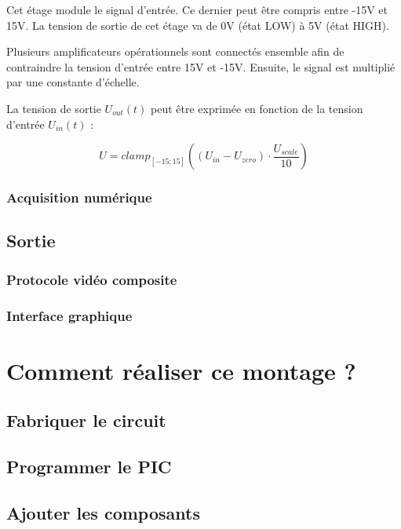\documentclass[11pt]{article}
\begin{document}
Cet étage module le signal d'entrée. Ce dernier peut être compris entre -15V et 15V. La tension de sortie de cet étage va de 0V (état LOW) à 5V (état HIGH).

Plusieurs amplificateurs opérationnels sont connectés ensemble afin de contraindre la tension d'entrée entre 15V et -15V. Ensuite, le signal est multiplié par une constante d'échelle.

La tension de sortie $U_{out}(t)$ peut être exprimée en fonction de la tension d'entrée $U_{in}(t)$ :

\[ U = clamp_{[-15;15]}((U_{in} - U_{zero}) \cdot \frac{U_{scale}}{10}) \]



\subsubsection{Acquisition numérique}

\subsection{Sortie}

\subsubsection{Protocole vidéo composite}

\subsubsection{Interface graphique}


\section {Comment réaliser ce montage ?}

\subsection{Fabriquer le circuit}

\subsection{Programmer le PIC}

\subsection{Ajouter les composants}
\end{document}
